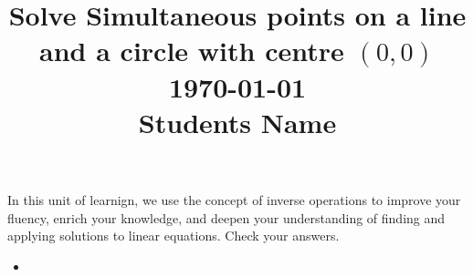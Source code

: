 \documentclass[12pt, a4paper, addpoints]{exam}
\title{\large Solve Simultaneous  points on a  line and a 
circle with centre \((0, 0)\)     \\ \dayofweekname{\day}{\month}{\year} \today \\\vspace{2mm} \quad  Students Name \underline{\hspace{8cm}}}
\date{}
\begin{document}
\thispagestyle{empty} 

\maketitle

\LARGE 

\noindent 
In this unit of learnign, we use the concept of inverse operations to improve your fluency, enrich your knowledge, and deepen your understanding of finding and applying solutions to linear equations. Check your answers.
\setlength{\columnsep}{1pt}
\thispagestyle{empty} 
\begin{questions}

\begin{mdframed}[backgroundcolor=gray!10]
\begin{multicols}{2}
\large
\begin{itemize}
\item 
\end{itemize}
\end{multicols}
\end{mdframed}
\small
\begin{multicols}{2}
\tableofcontents
\end{multicols}
\newpage

\Large

\newpage


\newpage
\end{questions}
\end{document}
